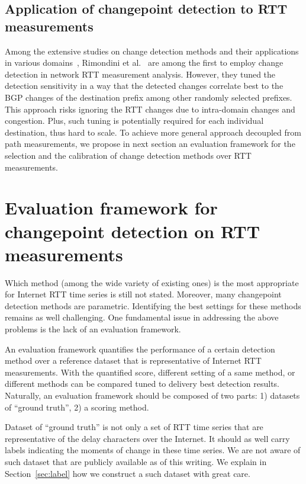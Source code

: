\subsection{Application of changepoint detection to RTT measurements}
Among the extensive studies on change detection methods and their applications in various domains~\cite{Zhang2007,Reeves2007, Yu2008},
Rimondini et al.~\cite{Rimondini2014} are among the first to employ change detection in network RTT measurement analysis.
However, they tuned the detection sensitivity in a way that the detected changes correlate best to the BGP changes of the destination prefix among other randomly selected prefixes.
This approach risks ignoring the RTT changes due to intra-domain changes and congestion.
Plus, such tuning is potentially required for each individual destination, thus hard to scale.
To achieve more general approach decoupled from path measurements, we propose in next section an evaluation framework for the selection and the calibration of change detection methods over RTT measurements.


\section{Evaluation framework for changepoint detection on RTT measurements}
\label{sec:eval_frame}
Which method (among the wide variety of existing ones) is the most appropriate for Internet RTT time series is still not stated. 
Moreover, many changepoint detection methods are parametric. 
Identifying the best settings for these methods remains as well challenging.
One fundamental issue in addressing the above problems is the lack of an evaluation framework.

An evaluation framework quantifies the performance of a certain detection method over a reference dataset that is representative of Internet RTT measurements.
With the quantified score, different setting of a same method, or different methods can be compared tuned to delivery best detection results.
Naturally, an evaluation framework should be composed of two parts: 1) datasets of ``ground truth'', 2) a scoring method.

Dataset of ``ground truth'' is not only a set of RTT time series that are representative of the delay characters over the Internet.
It should as well carry labels indicating the moments of change in these time series.
We are not aware of such dataset that are publicly available as of this writing.
We explain in Section~\ref{sec:label} how we construct a such dataset with great care.

